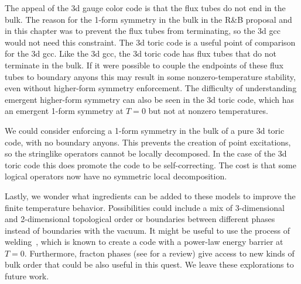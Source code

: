 The appeal of the 3d gauge color code is that the flux tubes do not end in the bulk.
The reason for the 1-form symmetry in the bulk in the R\&B proposal and in this chapter was to prevent the flux tubes from terminating, so the 3d gcc would not need this constraint.
The 3d toric code is a useful point of comparison for the 3d gcc.
Like the 3d gcc, the 3d toric code has flux tubes that do not terminate in the bulk.
If it were possible to couple the endpoints of these flux tubes to boundary anyons this may result in some nonzero-temperature stability, even without higher-form symmetry enforcement. The difficulty of understanding emergent higher-form symmetry can also be seen in the 3d toric code, which has an emergent 1-form symmetry at $T=0$ but not at nonzero temperatures. 

We could consider enforcing a 1-form symmetry in the bulk of a pure 3d toric code, with no boundary anyons.
This prevents the creation of point excitations, so the stringlike operators cannot be locally decomposed. 
In the case of the 3d toric code this does promote the code to be self-correcting. The cost is that some logical operators now have no symmetric local decomposition. 

Lastly, we wonder what ingredients can be added to these models to improve the finite temperature behavior. Possibilities could include a mix of 3-dimensional and 2-dimensional topological order or boundaries between different phases instead of boundaries with the vacuum. It might be useful to use the process of welding~\cite{Michnicki2014PowerLaw}, which is known to create a code with a power-law energy barrier at $T=0$. Furthermore, fracton phases (see \cite{NandkishoreHermele2019} for a review) give access to new kinds of bulk order that could be also useful in this quest. We leave these explorations to future work. 

%
%
%
